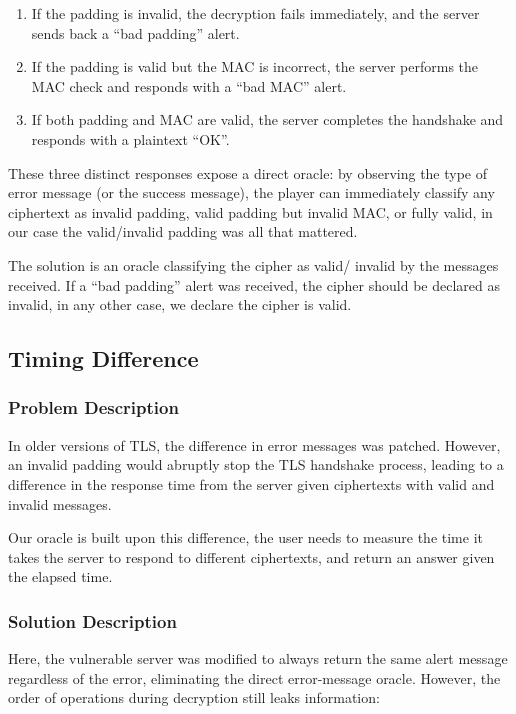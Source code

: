 \documentclass[sigconf]{acmart}
\begin{document}
\begin{enumerate}[label=-]
    \item If the padding is invalid, the decryption fails immediately, and the server sends back a “bad padding” alert.
    \item If the padding is valid but the MAC is incorrect, the server performs the MAC check and responds with a “bad MAC” alert.
    \item If both padding and MAC are valid, the server completes the handshake and responds with a plaintext “OK”.
\end{enumerate}

These three distinct responses expose a direct oracle: by observing the type of error message (or the success message), the player can immediately classify any ciphertext as invalid padding, valid padding but invalid MAC, or fully valid, in our case the valid/invalid padding was all that mattered.

The solution is an oracle classifying the cipher as valid/ invalid by the messages received. If a “bad padding” alert was received, the cipher should be declared as invalid, in any other case, we declare the cipher is valid.

\subsection{Timing Difference}
\subsubsection{Problem Description}
In older versions of TLS, the difference in error messages was patched. However, an invalid padding would abruptly stop the TLS handshake process, leading to a difference in the response time from the server given ciphertexts with valid and invalid messages.

Our oracle is built upon this difference, the user needs to measure the time it takes the server to respond to different ciphertexts, and return an answer given the elapsed time.

\subsubsection{Solution Description}
Here, the vulnerable server was modified to always return the same alert message regardless of the error, eliminating the direct error-message oracle. However, the order of operations during decryption still leaks information:
\end{document}
